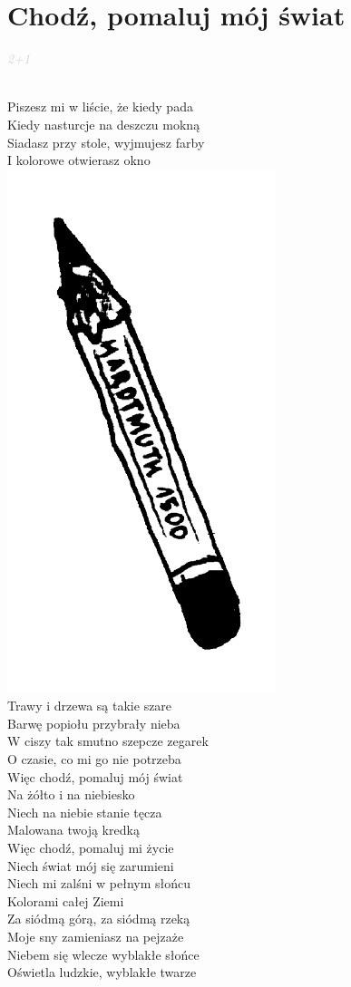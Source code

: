 \documentclass[a5paper, 10pt]{book}
\begin{document}
\section{Chodź, pomaluj mój świat}\textcolor{lightgray}{\textit{2+1}}\\~\\
\begin{minipage}[t]{0.6\textwidth}
  Piszesz mi w liście, że kiedy pada\\
  Kiedy nasturcje na deszczu mokną\\
  Siadasz przy stole, wyjmujesz farby\\
  I kolorowe otwierasz okno\\
  \hspace*{0.75\textwidth}\includegraphics[height=0.3\textwidth]{images/chodz_pomaluj_moj_swiat.png}\vspace*{-0.305\textwidth}~~\\

  Trawy i drzewa są takie szare\\
  Barwę popiołu przybrały nieba\\
  W ciszy tak smutno szepcze zegarek\\
  O czasie, co mi go nie potrzeba\\

  \hspace*{4mm} Więc chodź, pomaluj mój świat\\
  \hspace*{4mm} Na żółto i na niebiesko\\
  \hspace*{4mm} Niech na niebie stanie tęcza\\
  \hspace*{4mm} Malowana twoją kredką\\
  \hspace*{4mm} Więc chodź, pomaluj mi życie\\
  \hspace*{4mm} Niech świat mój się zarumieni\\
  \hspace*{4mm} Niech mi zalśni w pełnym słońcu\\
  \hspace*{4mm} Kolorami całej Ziemi\\

  Za siódmą górą, za siódmą rzeką\\
  Moje sny zamieniasz na pejzaże\\
  Niebem się wlecze wyblakłe słońce\\
  Oświetla ludzkie, wyblakłe twarze\\

\end{minipage}
\end{document}
